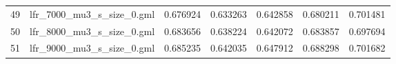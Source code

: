 \begin{tabular}{llrrrrr}
49 &   lfr\_7000\_mu3\_s\_size\_0.gml &                          0.676924 &                             0.633263 &                            0.642858 &                           0.680211 &                        0.701481 \\
50 &   lfr\_8000\_mu3\_s\_size\_0.gml &                          0.683656 &                             0.638224 &                            0.642072 &                           0.683857 &                        0.697694 \\
51 &   lfr\_9000\_mu3\_s\_size\_0.gml &                          0.685235 &                             0.642035 &                            0.647912 &                           0.688298 &                        0.701682 \\
\bottomrule
\end{tabular}
